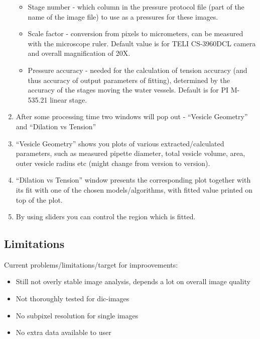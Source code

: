 \documentclass[a4paper,12pt]{article}
\begin{document}
\begin{enumerate}
\begin{itemize}
		\item Stage number - which column in the pressure protocol file (part of the name of the image file) to use as a pressures for these images.
		\item Scale factor - conversion from pixels to micrometers, can be measured with the microscope ruler. Default value is for TELI CS-3960DCL camera and overall magnification of 20X.
		\item Pressure accuracy - needed for the calculation of tension accuracy (and thus accuracy of output parameters of fitting), determined by the accuracy of the stages moving the water vessels. Default is for PI M-535.21 linear stage.
	\end{itemize}
	\item After some processing time two windows will pop out - ``Vesicle Geometry'' and ``Dilation vs Tension''
	\item ``Vesicle Geometry'' shows you plots of various extracted/calculated parameters, such as measured pipette diameter, total vesicle volume, area, outer vesicle radius etc (might change from version to version).
	\item ``Dilation vs Tension'' window presents the corresponding plot together with its fit with one of the chosen models/algorithms, with fitted value printed on top of the plot.
	\item By using sliders you can control the region which is fitted.
\end{enumerate}

\subsection{Limitations}\label{vampy-limits}
Current problems/limitations/target for improovements:
\begin{itemize}
	\item Still not overly stable image analysis, depends a lot on overall image quality
	\item Not thoroughly tested for dic-images
	\item No subpixel resolution for single images
	\item No extra data available to user
\end{itemize}


\end{document}
